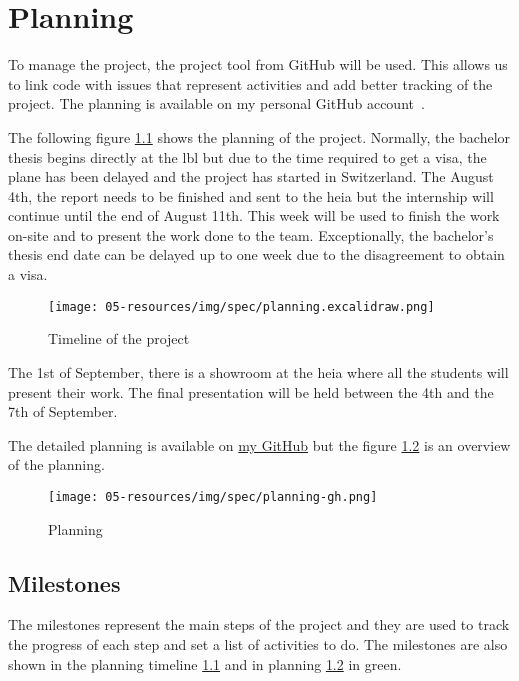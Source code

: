 \chapter{Planning}
\label{spec:ch:planning}

To manage the project, the project tool from GitHub will be used.
This allows us to link code with issues that represent activities and add better tracking of the project.
The planning is available on my personal GitHub account~\cite{github-project}.

The following figure \ref{spec:fig:timeline} shows the planning of the project.
Normally, the bachelor thesis begins directly at the \acrshort{lbl} but due to the time required to get a visa, the plane has been delayed and the project has started in Switzerland.
The August 4th, the report needs to be finished and sent to the \acrshort{heia} but the internship will continue until the end of August 11th.
This week will be used to finish the work on-site and to present the work done to the team.
Exceptionally, the bachelor's thesis end date can be delayed up to one week due to the disagreement to obtain a visa.

\begin{figure}[ht]
    \centering
    \texttt{[image: 05-resources/img/spec/planning.excalidraw.png]}
    \caption{Timeline of the project}
    \label{spec:fig:timeline}
\end{figure}


The 1st of September, there is a showroom at the \acrshort{heia} where all the students will present their work.
The final presentation will be held between the 4th and the 7th of September.

The detailed planning is available on \href{https://github.com/users/simbarras/projects/3/views/1}{my GitHub} but the figure \ref{spec:fig:planning-gh} is an overview of the planning.

\begin{figure}[ht]
    \centering
    \texttt{[image: 05-resources/img/spec/planning-gh.png]}
    \caption{Planning}
    \label{spec:fig:planning-gh}
\end{figure}


\section{Milestones}
\label{spec:ch:planning:milestones}

The milestones represent the main steps of the project and they are used to track the progress of each step and set a list of activities to do.
The milestones are also shown in the planning timeline \ref{spec:fig:timeline} and in planning \ref{spec:fig:planning-gh} in green.


